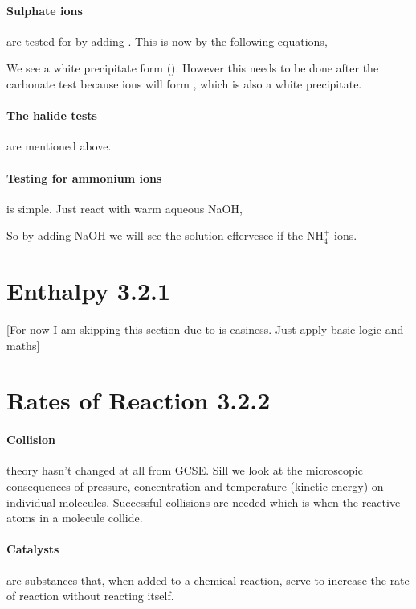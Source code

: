 	\paragraph{Sulphate ions} are tested for by adding . This is now by the following equations,
	\begin{center}
	\end{center}
	We see a white precipitate form ().
	However this needs to be done after the carbonate test because  ions will form , which is also a white precipitate.
	
	\paragraph{The halide tests} are mentioned above.
	
	\paragraph{Testing for ammonium ions} is simple. Just react with warm aqueous NaOH,
	\begin{center}
	\end{center}
	So by adding NaOH we will see the solution effervesce if the NH$_4^+$ ions.
	
\section{Enthalpy 3.2.1}
[For now I am skipping this section due to is easiness. Just apply basic logic and maths]

\section{Rates of Reaction 3.2.2}
	\paragraph{Collision} theory hasn't changed at all from GCSE.
	Sill we look at the microscopic consequences of pressure, concentration and temperature (kinetic energy) on individual molecules.
	Successful collisions are needed which is when the reactive atoms in a molecule collide.
	
	\paragraph{Catalysts} are substances that, when added to a chemical reaction, serve to increase the rate of reaction without reacting itself.
	
